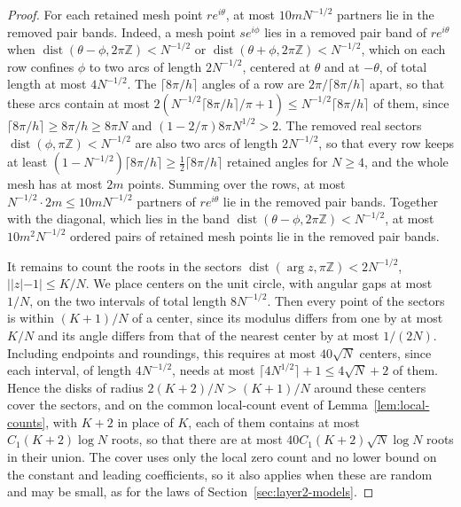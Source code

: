 \begin{proof}
For each retained mesh point $re^{i\theta}$, at most $10mN^{-1/2}$
partners lie in the removed pair bands. Indeed, a mesh point
$se^{i\phi}$ lies in a removed pair band of $re^{i\theta}$ when
$\operatorname{dist}(\theta-\phi,2\pi\mathbb Z)<N^{-1/2}$ or
$\operatorname{dist}(\theta+\phi,2\pi\mathbb Z)<N^{-1/2}$, which on each
row confines $\phi$ to two arcs of length $2N^{-1/2}$,
centered at $\theta$ and at $-\theta$, of total length at most $4N^{-1/2}$.
The $\lceil8\pi/h\rceil$ angles of a row are $2\pi/\lceil8\pi/h\rceil$
apart, so that these arcs contain at most
$2(N^{-1/2}\lceil8\pi/h\rceil/\pi+1)
\le N^{-1/2}\lceil8\pi/h\rceil$
of them, since $\lceil8\pi/h\rceil\ge8\pi/h\ge8\pi N$ and
$(1-2/\pi)8\pi N^{1/2}>2$. The removed real sectors
$\operatorname{dist}(\phi,\pi\mathbb Z)<N^{-1/2}$ are also two arcs of
length $2N^{-1/2}$, so that every row keeps at least
$(1-N^{-1/2})\lceil8\pi/h\rceil\ge\tfrac12\lceil8\pi/h\rceil$ retained
angles for $N\ge4$, and the whole mesh has at most $2m$ points. Summing over
the rows, at most $N^{-1/2}\cdot2m\le10mN^{-1/2}$ partners of
$re^{i\theta}$ lie in the removed pair bands.
Together with the diagonal, which lies in the band
$\operatorname{dist}(\theta-\phi,2\pi\mathbb Z)<N^{-1/2}$, at most
$10m^2N^{-1/2}$ ordered pairs of retained mesh points lie in the removed
pair bands.

It remains to count the roots in the sectors
$\operatorname{dist}(\arg z,\pi\mathbb Z)<2N^{-1/2}$, $||z|-1|\le K/N$.
We place centers on the unit circle, with angular gaps at most $1/N$, on
the two intervals of total length $8N^{-1/2}$.
Then every point of the sectors is within $(K+1)/N$ of a center, since its
modulus differs from one by at most $K/N$ and its angle differs from that
of the nearest center by at most $1/(2N)$.
Including endpoints and roundings, this requires at most $40\sqrt N$
centers, since each interval, of length $4N^{-1/2}$, needs at most
$\lceil4N^{1/2}\rceil+1\le4\sqrt N+2$ of them.
Hence the disks of radius $2(K+2)/N>(K+1)/N$ around these centers cover
the sectors, and on the common local-count event of
Lemma~\ref{lem:local-counts}, with $K+2$ in place of $K$, each of them
contains at most $C_1(K+2)\log N$ roots, so that there are at most
$40C_1(K+2)\sqrt N\log N$ roots in their union.
The cover uses only the local zero count and no lower bound on the
constant and leading coefficients, so it also applies when these are
random and may be small, as for the laws of
Section~\ref{sec:layer2-models}.


\end{proof}
